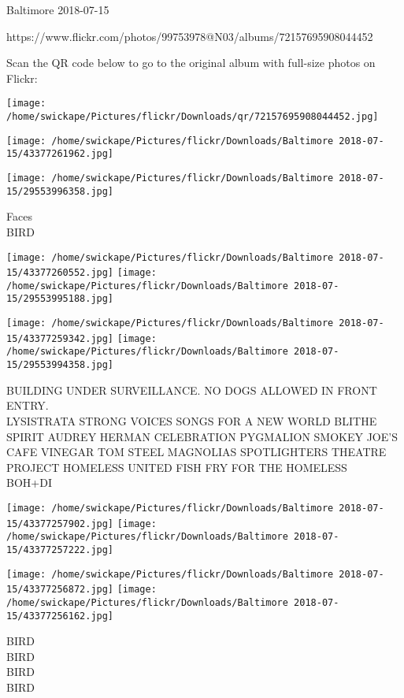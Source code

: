 \documentclass[10pt,letterpaper]{article}
\begin{document}
Baltimore 2018-07-15

https://www.flickr.com/photos/99753978@N03/albums/72157695908044452

Scan the QR code below to go to the original album with full-size photos on Flickr:

\texttt{[image: /home/swickape/Pictures/flickr/Downloads/qr/72157695908044452.jpg]}
\pagebreak

\texttt{[image: /home/swickape/Pictures/flickr/Downloads/Baltimore 2018-07-15/43377261962.jpg]}

\vspace{0.25in}
\texttt{[image: /home/swickape/Pictures/flickr/Downloads/Baltimore 2018-07-15/29553996358.jpg]}

Faces\\
BIRD
\pagebreak

\texttt{[image: /home/swickape/Pictures/flickr/Downloads/Baltimore 2018-07-15/43377260552.jpg]}
\texttt{[image: /home/swickape/Pictures/flickr/Downloads/Baltimore 2018-07-15/29553995188.jpg]}

\texttt{[image: /home/swickape/Pictures/flickr/Downloads/Baltimore 2018-07-15/43377259342.jpg]}
\texttt{[image: /home/swickape/Pictures/flickr/Downloads/Baltimore 2018-07-15/29553994358.jpg]}

BUILDING UNDER SURVEILLANCE.  NO DOGS ALLOWED IN FRONT ENTRY.\\
LYSISTRATA STRONG VOICES SONGS FOR A NEW WORLD BLITHE SPIRIT AUDREY HERMAN CELEBRATION PYGMALION SMOKEY JOE'S CAFE VINEGAR TOM STEEL MAGNOLIAS SPOTLIGHTERS THEATRE\\
PROJECT HOMELESS UNITED FISH FRY FOR THE HOMELESS\\
BOH+DI
\pagebreak

\texttt{[image: /home/swickape/Pictures/flickr/Downloads/Baltimore 2018-07-15/43377257902.jpg]}
\texttt{[image: /home/swickape/Pictures/flickr/Downloads/Baltimore 2018-07-15/43377257222.jpg]}

\texttt{[image: /home/swickape/Pictures/flickr/Downloads/Baltimore 2018-07-15/43377256872.jpg]}
\texttt{[image: /home/swickape/Pictures/flickr/Downloads/Baltimore 2018-07-15/43377256162.jpg]}

BIRD\\
BIRD\\
BIRD\\
BIRD
\pagebreak
\end{document}
